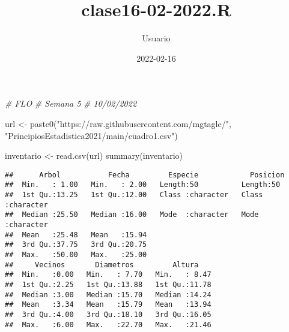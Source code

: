 \documentclass[
]{article}
\title{clase16-02-2022.R}
\author{Usuario}
\date{2022-02-16}
\newenvironment{Shaded}{\begin{snugshade}}{\end{snugshade}}
\newcommand{\CommentTok}[1]{\textcolor[rgb]{0.56,0.35,0.01}{\textit{#1}}}
\newcommand{\DecValTok}[1]{\textcolor[rgb]{0.00,0.00,0.81}{#1}}
\newcommand{\FunctionTok}[1]{\textcolor[rgb]{0.00,0.00,0.00}{#1}}
\newcommand{\NormalTok}[1]{#1}
\newcommand{\OtherTok}[1]{\textcolor[rgb]{0.56,0.35,0.01}{#1}}
\newcommand{\SpecialCharTok}[1]{\textcolor[rgb]{0.00,0.00,0.00}{#1}}
\newcommand{\StringTok}[1]{\textcolor[rgb]{0.31,0.60,0.02}{#1}}
\begin{document}
\maketitle

\begin{Shaded}
\begin{Highlighting}[]
\CommentTok{\# FLO}
\CommentTok{\# Semana 5}
\CommentTok{\# 10/02/2022}

\NormalTok{url }\OtherTok{\textless{}{-}} \FunctionTok{paste0}\NormalTok{(}\StringTok{"https://raw.githubusercontent.com/mgtagle/"}\NormalTok{,}
              \StringTok{"PrincipiosEstadistica2021/main/cuadro1.csv"}\NormalTok{)}


\NormalTok{inventario }\OtherTok{\textless{}{-}} \FunctionTok{read.csv}\NormalTok{(url)}
\FunctionTok{summary}\NormalTok{(inventario)}
\end{Highlighting}
\end{Shaded}

\begin{verbatim}
##      Arbol           Fecha         Especie            Posicion        
##  Min.   : 1.00   Min.   : 2.00   Length:50          Length:50         
##  1st Qu.:13.25   1st Qu.:12.00   Class :character   Class :character  
##  Median :25.50   Median :16.00   Mode  :character   Mode  :character  
##  Mean   :25.48   Mean   :15.94                                        
##  3rd Qu.:37.75   3rd Qu.:20.75                                        
##  Max.   :50.00   Max.   :25.00                                        
##     Vecinos       Diametros         Altura     
##  Min.   :0.00   Min.   : 7.70   Min.   : 8.47  
##  1st Qu.:2.25   1st Qu.:13.88   1st Qu.:11.78  
##  Median :3.00   Median :15.70   Median :14.24  
##  Mean   :3.34   Mean   :15.79   Mean   :13.94  
##  3rd Qu.:4.00   3rd Qu.:18.10   3rd Qu.:16.05  
##  Max.   :6.00   Max.   :22.70   Max.   :21.46
\end{verbatim}

\begin{Shaded}
\end{Shaded}
\end{document}
